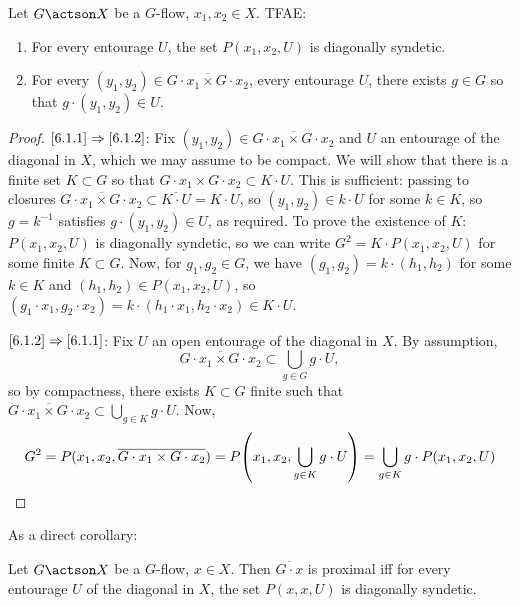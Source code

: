 \begin{prop}
Let $G\actson X$ be a $G$-flow, $x_{1}, x_{2}\in X$. TFAE:
\begin{enumerate}
\item \label{6.1.1} For every entourage $U$, the set $P(x_{1},x_{2},U)$ is diagonally syndetic.
\item \label{6.1.2} For every $(y_{1}, y_{2})\in \overline{G\cdot x_{1}\times G\cdot x_{2}}$, every entourage $U$, there exists $g\in G$ so that $g\cdot(y_{1}, y_{2})\in U$.
\end{enumerate}
\end{prop}

\begin{proof}
$\eqref{6.1.1}\Rightarrow \eqref{6.1.2}$: Fix $(y_{1}, y_{2})\in \overline{G\cdot x_{1}\times G\cdot x_{2}}$ and $U$ an entourage of the diagonal in $X$, which we may assume to be compact. We will show that there is a finite set $K\subset G$ so that $G\cdot x_{1}\times G\cdot x_{2} \subset K\cdot U$. This is sufficient: passing to closures $\overline{G\cdot x_{1}\times G\cdot x_{2}}\subset \overline{K\cdot U}=K\cdot U$, so $(y_{1}, y_{2})\in k\cdot U$ for some $k\in K$, so $g=k^{-1}$ satisfies $g\cdot(y_{1}, y_{2})\in U$, as required. To prove the existence of $K$: $P(x_{1},x_{2},U)$ is diagonally syndetic, so we can write $G^{2}=K\cdot P(x_{1},x_{2},U)$ for some finite $K\subset G$. Now, for $g_{1}, g_{2}\in G$, we have $(g_{1}, g_{2})=k\cdot(h_{1}, h_{2})$ for some $k\in K$ and $(h_{1}, h_{2})\in P(x_{1},x_{2},U)$, so $(g_{1}\cdot x_{1}, g_{2}\cdot x_{2})=k\cdot (h_{1}\cdot x_{1}, h_{2}\cdot x_{2})\in K\cdot U$.

$\eqref{6.1.2} \Rightarrow \eqref{6.1.1}$: Fix $U$ an open entourage of the diagonal in $X$. By assumption,
\[
\overline{G\cdot x_{1}\times G\cdot x_{2}}\subset \bigcup_{g\in G}g\cdot U,
\]
so by compactness, there exists $K\subset G$ finite such that $\overline{G\cdot x_{1}\times G\cdot x_{2}}\subset \bigcup_{g\in K}g\cdot U$. Now,
\begin{equation*}
G^{2}=P(x_{1}, x_{2}, \overline{G\cdot x_{1}\times G\cdot x_{2}})=P\!\left(x_{1}, x_{2}, \bigcup_{g\in K}g\cdot U\right)=\bigcup_{g\in K} g\cdot P(x_{1},x_{2},U) \qedhere
\end{equation*}
\end{proof}

As a direct corollary:

\begin{prop}\label{prop:prox}
Let $G\actson X$ be a $G$-flow, $x\in X$. Then $\overline{G\cdot x}$ is proximal iff for every entourage $U$ of the diagonal in $X$, the set $P(x,x,U)$ is diagonally syndetic.
\end{prop}

